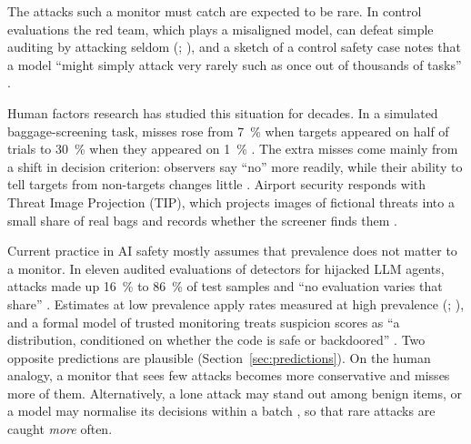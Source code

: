\documentclass[10pt]{article}
\begin{document}
The attacks such a monitor must catch are expected to be rare. In control evaluations the red team, which plays a misaligned model, can defeat simple auditing by attacking seldom (\citealp[Sec.~3.1]{greenblatt2024}; \citealp[Sec.~3.1]{bhatt2025}), and a sketch of a control safety case notes that a model ``might simply attack very rarely such as once out of thousands of tasks'' \citep[Sec.~6]{korbak2025}.

Human factors research has studied this situation for decades. In a simulated baggage-screening task, misses rose from \SI{7}{\percent} when targets appeared on half of trials to \SI{30}{\percent} when they appeared on \SI{1}{\percent} \citep{wolfe2005}. The extra misses come mainly from a shift in decision criterion: observers say ``no'' more readily, while their ability to tell targets from non-targets changes little \citep{wolfe2007}. Airport security responds with Threat Image Projection (TIP), which projects images of fictional threats into a small share of real bags and records whether the screener finds them \citep{cutler2009,buser2025}.

Current practice in AI safety mostly assumes that prevalence does not matter to a monitor. In eleven audited evaluations of detectors for hijacked LLM agents, attacks made up \SI{16}{\percent} to \SI{86}{\percent} of test samples and ``no evaluation varies that share'' \citep[Abstract]{abbasi2026}. Estimates at low prevalence apply rates measured at high prevalence (\citealp[Sec.~6.3]{srivastav2026}; \citealp[Sec.~III.E]{abbasi2026}), and a formal model of trusted monitoring treats suspicion scores as ``a distribution, conditioned on whether the code is safe or backdoored'' \citep[Sec.~2]{griffin2024}. Two opposite predictions are plausible (Section~\ref{sec:predictions}). On the human analogy, a monitor that sees few attacks becomes more conservative and misses more of them. Alternatively, a lone attack may stand out among benign items, or a model may normalise its decisions within a batch \citep{hida2026}, so that rare attacks are caught \emph{more} often.
\end{document}
